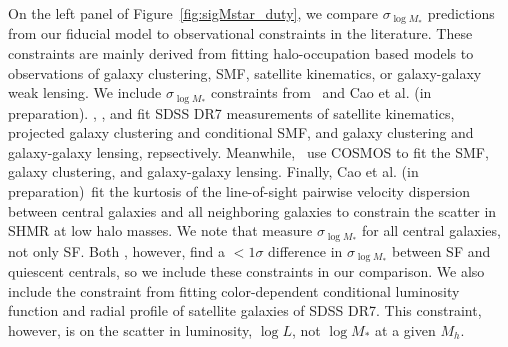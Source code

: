 \documentclass[12pt, letterpaper, preprint, tighten]{aastex62}
\newcommand{\cao}{Cao et al. (in preparation)}
\newcommand{\siglogm}{\sigma_{\log M_*}}
\begin{document}
On the left panel of Figure~\ref{fig:sigMstar_duty}, we compare $\siglogm$
predictions from our fiducial model to observational constraints in the 
literature. These constraints are mainly derived from fitting halo-occupation 
based models to observations of galaxy clustering, SMF, satellite kinematics, 
or galaxy-galaxy weak lensing. We include $\siglogm$ constraints 
from~\cite{more2011, leauthaud2012, reddick2013, tinker2013, zu2015} and \cao. 
\cite{more2011}, \cite{reddick2013}, and \cite{zu2015} fit SDSS DR7 measurements 
of satellite kinematics, projected galaxy clustering and conditional SMF, and 
galaxy clustering and galaxy-galaxy lensing, repsectively. Meanwhile,~\cite{leauthaud2012, tinker2013}
use COSMOS to fit the SMF, galaxy clustering, and galaxy-galaxy lensing.
Finally, \cao~fit the kurtosis of the line-of-sight pairwise velocity 
dispersion between central galaxies and all neighboring galaxies to constrain 
the scatter in SHMR at low halo masses. We note that
\cite{leauthaud2012, reddick2013, zu2015} measure $\siglogm$ for all central 
galaxies, not only SF. Both \cite{more2011, tinker2013},
however, find a $< 1\sigma$ difference in $\siglogm$ between SF and quiescent 
centrals, so we include these constraints in our comparison. We also include 
the \cite{lange2018a} constraint from fitting color-dependent conditional 
luminosity function and radial profile of satellite galaxies of SDSS DR7. This 
constraint, however, is on the scatter in luminosity, $\log L$, not $\log M_*$ 
at a given $M_h$.

\end{document}
